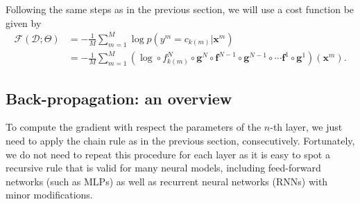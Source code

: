 Following the same steps as in the previous section, we will use a cost function be given by %
\begin{align}
\mathcal{F}(\mathcal{D};\Theta) & = -\frac{1}{M}\sum_{m=1}^{M} \log p(y^m=c_{k(m)} | \mathbf{x}^m)\nonumber\\ & = -\frac{1}{M}\sum_{m=1}^{M} (\log \circ f_{k(m)}^N \circ \mathbf{g}^N \circ \mathbf{f}^{N-1} \circ \mathbf{g}^{N-1} \circ \cdots \mathbf{f}^1 \circ \mathbf{g}^1)(\mathbf{x}^m).
\end{align}

\subsection{Back-propagation: an overview}
To compute the gradient with respect the parameters of the $n$-th layer, we just need to apply the chain rule as in the previous section, consecutively. 
Fortunately, we
do not need to repeat this procedure for each layer as it is easy to spot a recursive
rule that is valid for many neural models, including feed-forward networks (such as MLPs) as well as recurrent neural networks (RNNs) with minor modifications.  


%

